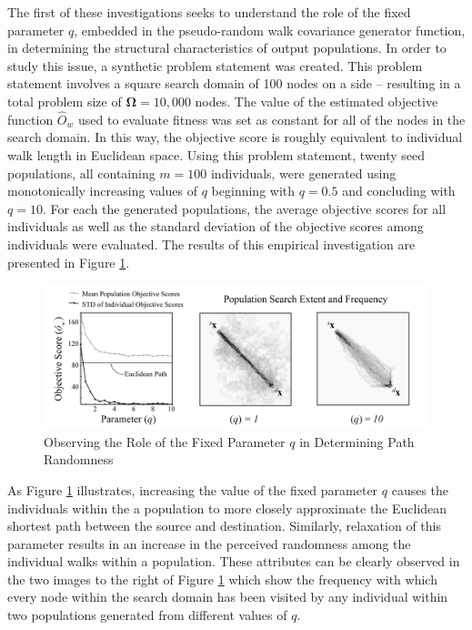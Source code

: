 The first of these investigations seeks to understand the role of the fixed parameter $q$, embedded in the pseudo-random walk covariance generator function, in determining the structural characteristics of output populations. In order to study this issue, a synthetic problem statement was created. This problem statement involves a square search domain of 100 nodes on a side – resulting in a total problem size of $\boldsymbol\Omega = 10,000$ nodes. The value of the estimated objective function $\hat{O}_w$ used to evaluate fitness was set as constant for all of the nodes in the search domain. In this way, the objective score is roughly equivalent to individual walk length in Euclidean space. Using this problem statement, twenty seed populations, all containing $m = 100$ individuals, were generated  using monotonically increasing values of $q$ beginning with $q = 0.5$ and concluding with $q = 10$. For each the generated populations, the average objective scores for all individuals as well as the standard deviation of the objective scores among individuals were evaluated. The results of this empirical investigation are presented in Figure \ref{fig:path-randomness}.
            
            \begin{figure}[Observing the Role of the Fixed Parameter $q$ in Determining Individual Path Randomness]
            \centering
            \includegraphics[width=5.5in]{figures/path-randomness-study.png}
            \caption[Observing the Role of the Fixed Parameter $q$ in Determining Individual Path Randomness]{Observing the Role of the Fixed Parameter $q$ in Determining Path Randomness}
            \label{fig:path-randomness}
            \end{figure}
            
As Figure \ref{fig:path-randomness} illustrates, increasing the value of the fixed parameter $q$ causes the individuals within the a population to more closely approximate the Euclidean shortest path between the source and destination. Similarly, relaxation of this parameter results in an increase in the perceived randomness among the individual walks within a population. These attributes can be clearly observed in the two images to the right of Figure \ref{fig:path-randomness} which show the frequency with which every node within the search domain has been visited by any individual within two populations generated from different values of $q$.
            

